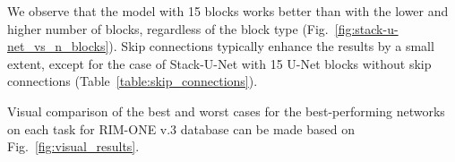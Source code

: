 \documentclass{llncs}
\begin{document}
We observe that the model with 15 blocks works better than with the lower and higher number of blocks, regardless of the block type (Fig.~\ref{fig:stack-u-net_vs_n_blocks}). Skip connections typically enhance the results by a small extent, except for the case of Stack-U-Net with 15 U-Net blocks without skip connections (Table~\ref{table:skip_connections}).

Visual comparison of the best and worst cases for the best-performing networks on each task for RIM-ONE v.3 database can be made based on Fig.~\ref{fig:visual_results}.
 
\end{document}
